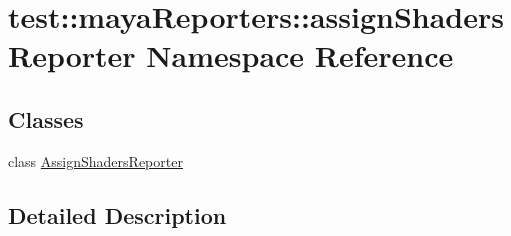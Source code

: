 \hypertarget{namespacetest_1_1mayaReporters_1_1assignShadersReporter}{\section{test\-:\-:maya\-Reporters\-:\-:assign\-Shaders\-Reporter \-Namespace \-Reference}
\label{d4/d52/namespacetest_1_1mayaReporters_1_1assignShadersReporter}
}
\subsection*{\-Classes}
\begin{DoxyCompactItemize}
\item 
class \hyperlink{classtest_1_1mayaReporters_1_1assignShadersReporter_1_1AssignShadersReporter}{\-Assign\-Shaders\-Reporter}
\end{DoxyCompactItemize}


\subsection{\-Detailed \-Description}
\begin{DoxyVerb}

\end{DoxyVerb}
 